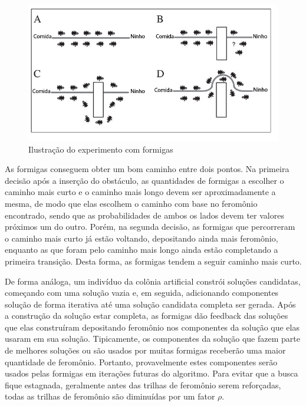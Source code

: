 \begin{figure}[h]
	\caption{\label{fig_aco}Ilustração do experimento com formigas}
	\begin{center}
	    \includegraphics[scale=0.5]{imagens/aco-sample.png}
	\end{center}
\end{figure}


As formigas conseguem obter um bom caminho entre dois pontos. Na primeira decisão após a inserção do obstáculo, as quantidades de formigas a escolher o caminho mais curto e o caminho mais longo devem ser aproximadamente a mesma, de modo que elas escolhem o caminho com base no feromônio encontrado, sendo que as probabilidades de ambos os lados devem ter valores próximos um do outro. Porém, na segunda decisão, as formigas que percorreram o caminho mais curto já estão voltando, depositando ainda mais feromônio, enquanto as que foram pelo caminho mais longo ainda estão completando a primeira transição. Desta forma, as formigas tendem a seguir caminho mais curto.

De forma análoga, um indivíduo da colônia artificial constrói soluções candidatas, começando com uma solução vazia e, em seguida, adicionando componentes solução de forma iterativa até uma solução candidata completa ser gerada. Após a construção da solução estar completa, as formigas dão feedback das soluções que elas construíram depositando feromônio nos componentes da solução que elas usaram em sua solução. Tipicamente, os componentes da solução que fazem parte de melhores soluções ou são usados por muitas formigas receberão uma maior quantidade de feromônio. Portanto, provavelmente estes componentes serão usados pelas formigas em iterações futuras do algoritmo. Para evitar que a busca fique estagnada, geralmente antes das trilhas de feromônio serem reforçadas, todas as trilhas de feromônio são diminuídas por um fator $\rho$.

